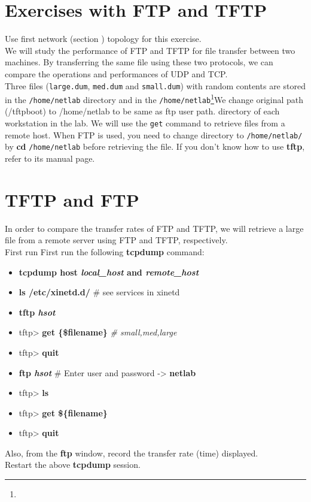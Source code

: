 \documentclass[10pt,a4paper]{article}
\numberwithin{equation}{section}
\numberwithin{figure}{section}
\numberwithin{table}{section}
\begin{document}
\section*{Exercises with FTP and TFTP}
	Use first network (section ) topology for this exercise.\\
	We will study the performance of FTP and TFTP for file transfer between two machines.
	By transferring the same file using these two protocols, we can compare the operations and performances of UDP and TCP. \\
	Three files (\texttt{large.dum}, \texttt{med.dum} and \texttt{small.dum}) with random contents are stored in the \texttt{/home/netlab} directory and in the \texttt{/home/netlab}\footnote{}{We change original path (/tftpboot) to /home/netlab to be same as ftp user path.} directory of each workstation in the lab.
	We will use the \texttt{get} command to retrieve files from a remote host.
	When FTP is used, you need to change directory to \texttt{/home/netlab/} by \textbf{cd} \texttt{/home/netlab} before retrieving the file.
	If you don’t know how to use \textbf{tftp}, refer to its manual page.


\section{TFTP and FTP}
	In order to compare the transfer rates of FTP and TFTP, we will retrieve a large file from a remote server using FTP and TFTP, respectively.\\
	First run First run the following \textbf{tcpdump} command:
	\begin{itemize}
		\item \textbf{tcpdump host \textit{local\_host} and \textit{remote\_host}}
	\end{itemize}
	\begin{itemize}		
		\item \textbf{ls /etc/xinetd.d/} \# see services in xinetd
		\item \textbf{tftp \textit{hsot}}
		\item tftp> \textbf{get \{\$filename\}} \textit{\# small,med,large}
		\item tftp> \textbf{quit}
		\item \textbf{ftp \textit{hsot}} \# Enter user and password -> \textbf{netlab}
		\item tftp> \textbf{ls}
		\item tftp> \textbf{get \$\{filename\}}
		\item tftp> \textbf{quit}
	\end{itemize}
	Also, from the \textbf{ftp} window, record the transfer rate (time) displayed. \\
	Restart the above \textbf{tcpdump} session.
\end{document}

